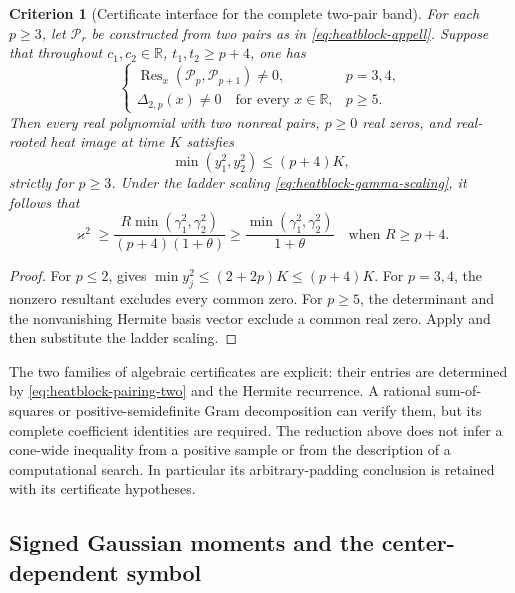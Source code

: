 \documentclass[11pt]{article}
\newtheorem{criterion}[theorem]{Criterion}
\theoremstyle{definition}
\theoremstyle{remark}
\newcommand{\R}{\mathbb R}
\begin{document}
\begin{criterion}[Certificate interface for the complete two-pair band]
\label{crit:heatblock-two-pair-certificates}
For each $p\ge3$, let $\mathcal P_r$ be constructed from two pairs as
in \eqref{eq:heatblock-appell}.  Suppose that throughout
$c_1,c_2\in\R$, $t_1,t_2\ge p+4$, one has
\[
 \begin{cases}
 \operatorname{Res}_x(\mathcal P_p,\mathcal P_{p+1})\ne0,
       &p=3,4,\\
 \Delta_{2,p}(x)\ne0\quad\text{for every }x\in\R,
       &p\ge5.
 \end{cases}
\]
Then every real polynomial with two nonreal pairs, $p\ge0$ real
zeros, and real-rooted heat image at time $K$ satisfies
\[
 \min(y_1^2,y_2^2)\le(p+4)K,
\]
strictly for $p\ge3$.  Under the ladder scaling
\eqref{eq:heatblock-gamma-scaling}, it follows that
\[
 \varkappa^2\ge
 \frac{R\min(\gamma_1^2,\gamma_2^2)}{(p+4)(1+\theta)}
 \ge\frac{\min(\gamma_1^2,\gamma_2^2)}{1+\theta}
 \quad\text{when }R\ge p+4.
\]
\end{criterion}

\begin{proof}
For $p\le2$,  gives
$\min y_j^2\le(2+2p)K\le(p+4)K$.  For $p=3,4$, the nonzero
resultant excludes every common zero.  For $p\ge5$, the determinant
and the nonvanishing Hermite basis vector exclude a common real zero.
Apply  and then substitute the ladder
scaling.
\end{proof}

The two families of algebraic certificates are explicit: their entries
are determined by \eqref{eq:heatblock-pairing-two} and the Hermite
recurrence.  A rational sum-of-squares or positive-semidefinite Gram
decomposition can verify them, but its complete coefficient identities
are required.  The reduction above does not infer a cone-wide
inequality from a positive sample or from the description of a
computational search.  In particular its arbitrary-padding conclusion
is retained with its certificate hypotheses.


\subsection{Signed Gaussian moments and the center-dependent symbol}
\end{document}
